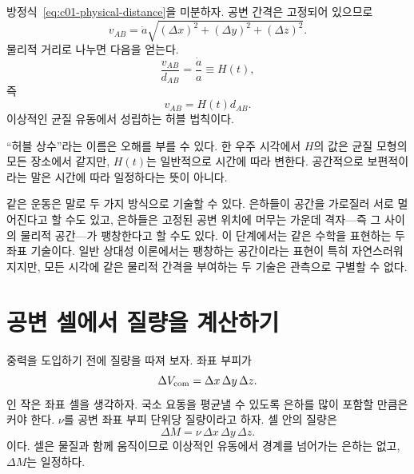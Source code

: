 방정식~\eqref{eq:c01-physical-distance}을 미분하자. 공변 간격은 고정되어 있으므로 \begin{equation}
v_{AB}=\dot a\sqrt{(\Delta x)^2+(\Delta y)^2+(\Delta z)^2}.
\end{equation}물리적 거리로 나누면 다음을 얻는다. \begin{equation}
\frac{v_{AB}}{d_{AB}}=\frac{\dot a}{a}\equiv H(t),
\label{eq:c01-hubble-parameter}
\end{equation}즉 \begin{equation}
\boxed{v_{AB}=H(t)d_{AB}.}
\label{eq:c01-hubble-law}
\end{equation}이상적인 균질 유동에서 성립하는 허블 법칙이다.

“허블 상수”라는 이름은 오해를 부를 수 있다. 한 우주 시각에서 \(H\)의 값은 균질 모형의 모든 장소에서 같지만, \(H(t)\)는 일반적으로 시간에 따라 변한다. 공간적으로 보편적이라는 말은 시간에 따라 일정하다는 뜻이 아니다.

\begin{classroomqa}\end{classroomqa}

같은 운동은 말로 두 가지 방식으로 기술할 수 있다. 은하들이 공간을 가로질러 서로 멀어진다고 할 수도 있고, 은하들은 고정된 공변 위치에 머무는 가운데 격자---즉 그 사이의 물리적 공간---가 팽창한다고 할 수도 있다. 이 단계에서는 같은 수학을 표현하는 두 좌표 기술이다. 일반 상대성 이론에서는 팽창하는 공간이라는 표현이 특히 자연스러워지지만, 모든 시각에 같은 물리적 간격을 부여하는 두 기술은 관측으로 구별할 수 없다.

\section{공변 셀에서 질량을 계산하기}

중력을 도입하기 전에 질량을 따져 보자. 좌표 부피가 \begin{equation}
\Delta V_{\rm com}=\Delta x\,\Delta y\,\Delta z.
\end{equation}인 작은 좌표 셀을 생각하자. 국소 요동을 평균낼 수 있도록 은하를 많이 포함할 만큼은 커야 한다. \(\nu\)를 공변 좌표 부피 단위당 질량이라고 하자. 셀 안의 질량은 \begin{equation}
\Delta M=\nu\,\Delta x\,\Delta y\,\Delta z.
\label{eq:c01-comoving-mass}
\end{equation}이다. 셀은 물질과 함께 움직이므로 이상적인 유동에서 경계를 넘어가는 은하는 없고, \(\Delta M\)는 일정하다.

